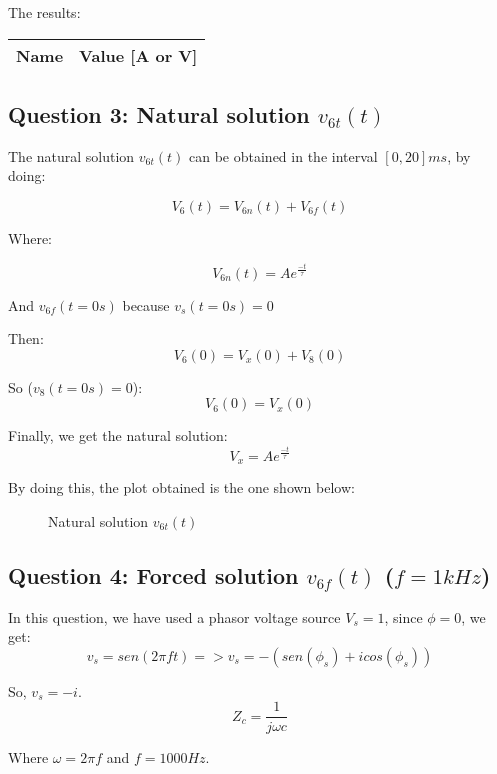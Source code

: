 The results:

\begin{center}
  \begin{tabular}{ | c | c | }
    \hline    
    {\bf Name} & {\bf Value [A or V]} \\ \hline
    \hline
  \end{tabular}
\end{center}


\subsection{Question 3: Natural solution $v_{6t}(t)$}
The natural solution $v_{6t}(t)$ can be obtained in the interval $[0,20]ms$, by doing: \par
\begin{equation}
     V_6(t) = V_{6n}(t) + V_{6f}(t)
\end{equation}\par
Where:\par
\begin{equation}
     V_{6n}(t) = {A}e^{\frac{-t}{\tau}}
\end{equation}\par
And $v_{6f}(t=0s)$ because $v_s(t=0s)=0$\par
Then:
\begin{equation}
     V_6(0) = V_x(0) + V_8(0)
\end{equation}\par
So ($v_8(t=0s)=0$):
\begin{equation}
     V_6(0) = V_x(0) 
\end{equation}\par
Finally, we get the natural solution:
\begin{equation}
     V_x =  {A}e^{\frac{-t}{\tau}}
\end{equation}\par

By doing this, the plot obtained is the one shown below:

\begin{figure}[H] \centering
\caption{Natural solution $v_{6t}(t)$}
\label{fig:plot3}
\end{figure}


\subsection{Question 4: Forced solution $v_{6f}(t)$ ($f=1kHz$)}
In this question, we have used a phasor voltage source $V_s = 1$, since $\phi = 0$, we get:
\begin{equation}
     v_s = sen(2\pi ft) => v_s = -(sen(\phi_s) + icos(\phi_s))
\end{equation}\par
So, $v_s=-i$.
\begin{equation}
     Z_c = \frac{1}{j\omega c}
\end{equation}\par
Where $\omega= 2\pi f$ and $f= 1000Hz$.\par

